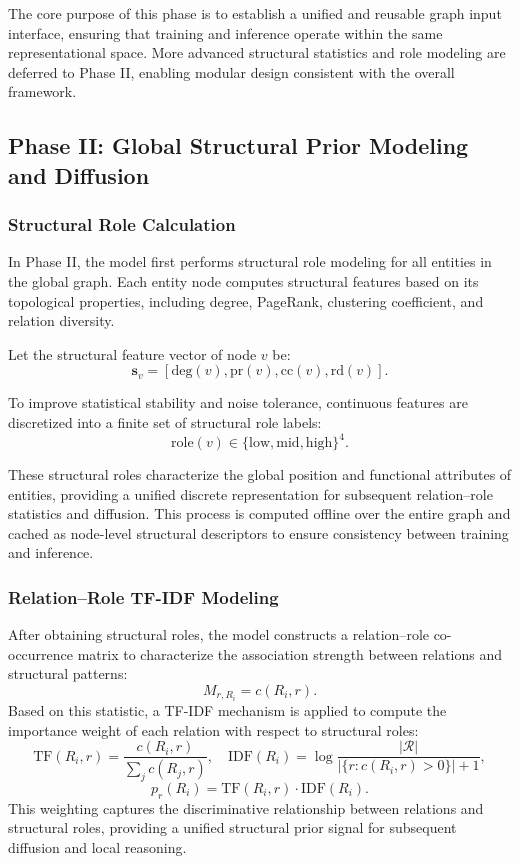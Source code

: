 \documentclass[preprint,12pt]{elsarticle}
\begin{document}
The core purpose of this phase is to establish a unified and reusable graph input interface, ensuring that training and inference operate within the same representational space. More advanced structural statistics and role modeling are deferred to Phase II, enabling modular design consistent with the overall framework.


\subsection{Phase II: Global Structural Prior Modeling and Diffusion}

\subsubsection{Structural Role Calculation}

In Phase II, the model first performs structural role modeling for all entities in the global graph. Each entity node computes structural features based on its topological properties, including degree, PageRank, clustering coefficient, and relation diversity.

Let the structural feature vector of node $v$ be:
\[
\mathbf{s}_v=[\text{deg}(v),\text{pr}(v),\text{cc}(v),\text{rd}(v)].
\]

To improve statistical stability and noise tolerance, continuous features are discretized into a finite set of structural role labels:
\[
\text{role}(v)\in\{\text{low},\text{mid},\text{high}\}^4.
\]

These structural roles characterize the global position and functional attributes of entities, providing a unified discrete representation for subsequent relation–role statistics and diffusion. This process is computed offline over the entire graph and cached as node-level structural descriptors to ensure consistency between training and inference.
\subsubsection{Relation–Role TF-IDF Modeling}
After obtaining structural roles, the model constructs a relation–role co-occurrence matrix to characterize the association strength between relations and structural patterns:
\[
M_{r,R_i}=c(R_i,r).
\]
Based on this statistic, a TF-IDF mechanism is applied to compute the importance weight of each relation with respect to structural roles:
\[
\mathrm{TF}(R_i,r)=\frac{c(R_i,r)}{\sum_j c(R_j,r)}, \quad
\mathrm{IDF}(R_i)=\log\frac{|\mathcal{R}|}{|\{r:c(R_i,r)>0\}|+1},
\]
\[
p_r(R_i)=\mathrm{TF}(R_i,r)\cdot\mathrm{IDF}(R_i).
\]
This weighting captures the discriminative relationship between relations and structural roles, providing a unified structural prior signal for subsequent diffusion and local reasoning.
\end{document}
